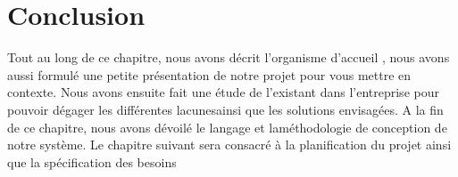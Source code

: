\section{Conclusion}

Tout au long de ce chapitre, nous avons décrit l’organisme d’accueil , nous avons aussi
formulé une petite présentation de notre projet pour vous mettre en contexte. Nous avons
ensuite fait une étude de l’existant dans l’entreprise pour pouvoir dégager les différentes lacunesainsi que les solutions envisagées. A la fin de ce chapitre, nous avons dévoilé le langage et laméthodologie de conception de notre système.
Le chapitre suivant sera consacré à la planification du projet ainsi que la spécification des
besoins
